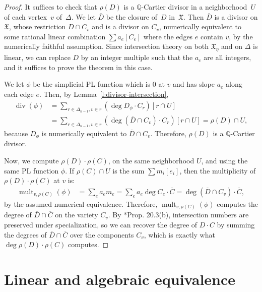 \documentclass[11pt,reqno]{amsart}
\theoremstyle{definition}
\renewcommand{\div}{\operatorname{div}}
\newcommand{\mult}{\operatorname{mult}}
\newcommand{\QQ}{\mathbb Q}
\newcommand{\X}{\mathfrak X}
\begin{document}
\begin{proof}
It suffices to check that $\rho(D)$ is a $\QQ$-Cartier divisor in
a neighborhood~$U$ of each vertex~$v$ of~$\Delta$. We let $\overline D$ be the
closure of~$D$ in~$\X$. Then $\overline D$ is a divisor on $\X$, whose
restriction $D \cap C_v$ and is a divisor on $C_v$,
numerically equivalent to some rational linear combination $\sum a_e [C_{e}]$
where the edges $e$ contain $v$, by the numerically faithful assumption.
Since intersection theory on both $\X_\eta$ and on $\Delta$ is linear, we can
replace $D$ by an integer multiple such that the $a_e$ are all integers, and it
suffices to prove the theorem in this case.

We let $\phi$ be the simplicial PL function which is $0$ at $v$ and has slope
$a_e$ along each edge $e$. Then, by Lemma~\ref{l:divisor-intersection},
\begin{align*}
\div(\phi)
&= \sum_{r \in \Delta_{n-1}, v \in r} (\deg D_\phi \cdot C_r) [r \cap U] \\
&= \sum_{r \in \Delta_{n-1}, v \in r} (\deg (\overline D \cap C_v) \cdot C_r) [r
\cap U]
= \rho(D) \cap U,
\end{align*}
because $D_\phi$ is numerically equivalent to $\overline D \cap C_v$. Therefore,
$\rho(D)$ is a $\QQ$-Cartier divisor.

Now, we compute $\rho(D) \cdot \rho(C)$, on the same neighborhood $U$, and using
the same PL function $\phi$. If $\rho(C) \cap U$ is the sum $\sum m_i [e_i]$, then
the multiplicity of $\rho(D) \cdot \rho(C)$ at $v$ is:
\begin{align*}
\mult_{v,\rho(C)}(\phi) &= \sum_e a_e m_e 
= \sum_e a_e \deg C_e \cdot \overline C 
= \deg (\overline D \cap C_v) \cdot \overline C,
\end{align*}
by the assumed numerical equivalence. Therefore, $\mult_{v,\rho(C)}(\phi)$
computes the degree of $\overline D \cap \overline C$ on the variety $C_v$. By
\cite{fulton}*{Prop. 20.3(b)}, intersection numbers are preserved under
specialization, so we can recover the degree of $D \cdot C$ by summing the
degrees of $\overline D \cap \overline C$ over the components $C_v$, which is
exactly what $\deg \rho(D) \cdot \rho(C)$ computes.
\end{proof}

\section{Linear and algebraic equivalence}\label{s:equiv}
\end{document}
